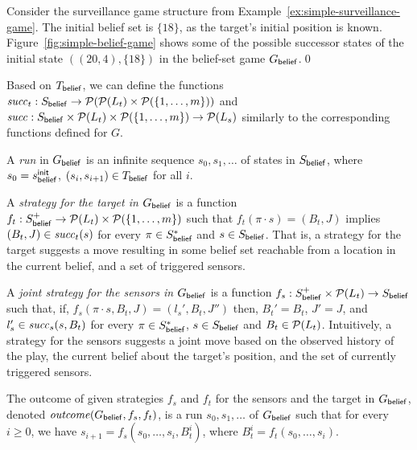 \begin{example}\label{ex:simple-belief-game}
Consider the surveillance game structure from Example~\ref{ex:simple-surveillance-game}. The initial belief set is $\{18\}$, as the target's initial position is known. Figure~\ref{fig:simple-belief-game} shows some of the possible successor states of the initial state $((20,4),\{18\})$  in the belief-set game $G_{\mathsf{belief}}$.\qed
\end{example}

Based on  $T_{\mathsf{belief}}$, we can define the functions $\mathit{succ}_t : S_{\mathsf{belief}} \to \mathcal{P}(\mathcal{P}(L_t) \times  \mathcal{P}(\{1,\ldots,m\}))$ and  $\mathit{succ} : S_{\mathsf{belief}} \times \mathcal{P}(L_t) \times  \mathcal{P}(\{1,\ldots,m\}) \to \mathcal{P}(L_s)$ similarly to the corresponding functions defined for $G$. 

A \emph{run} in $G_{\mathsf{belief}}$ is an infinite sequence $s_0,s_1,\ldots$ of states in $S_{\mathsf{belief}}$, where $s_0 = s_{\mathsf{belief}}^{\mathsf{init}}$,  $(s_i,s_{i+1}) \in T_{\mathsf{belief}}$ for all $i$. 

A \emph{strategy for the target in $G_{\mathsf{belief}}$} is a function $f_t: S_{\mathsf{belief}}^+ \to \mathcal{P}(L_t) \times \mathcal{P}(\{1,\ldots,m\})$ such that $f_t(\pi\cdot s) = (B_t, J)$ implies $(B_t ,J)\in \mathit{succ}_t(s)$  for every $\pi \in S_{\mathsf{belief}}^*$ and $s \in S_{\mathsf{belief}}$. That is, a strategy for the target suggests a move resulting in some belief set reachable from a location in the current belief, and a set of triggered sensors.

A \emph{joint strategy for the sensors in $G_{\mathsf{belief}}$} is a function $f_s : S_{\mathsf{belief}}^+ \times \mathcal{P}(L_t) \to S_{\mathsf{belief}}$ such that, if, $f_s(\pi\cdot s,B_t,J) = (l_s',B_t,J'')$ then, $B_t' = B_t$, $J' = J$, and $l_s' \in \mathit{succ}_s(s,B_t)$ for every $\pi \in S_{\mathsf{belief}}^*$, $s \in S_{\mathsf{belief}}$ and $B_t \in \mathcal{P}(L_t)$. Intuitively, a strategy for the sensors suggests a joint move based on the observed history of the play, the current belief about the target's position, and the set of currently triggered sensors.

The outcome of given strategies $f_s$ and $f_t$ for the sensors and the target in $G_{\mathsf{belief}}$, denoted $\mathit{outcome}(G_{\mathsf{belief}},f_s,f_t)$, is a run $s_0,s_1,\ldots$ of $G_{\mathsf{belief}}$ such that for every $i \geq 0$, we have $s_{i+1} = f_s(s_0,\ldots,s_i,B_t^i)$, where $B_t^i = f_t(s_0,\ldots,s_i)$.


